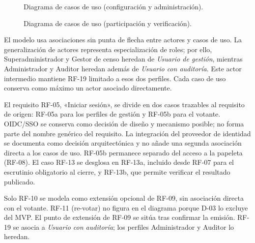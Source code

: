 \begin{figure}[p]
  \centering
  \resizebox{0.94\textwidth}{!}{}
  \caption{Diagrama de casos de uso (configuración y administración).}
  \label{fig:casos-uso-gestion}
\end{figure}

\begin{figure}[p]
  \centering
  \resizebox{0.94\textwidth}{!}{}
  \caption{Diagrama de casos de uso (participación y verificación).}
  \label{fig:casos-uso-votacion}
\end{figure}

El modelo usa asociaciones sin punta de flecha entre actores y casos de uso.
La generalización de actores representa especialización de roles; por ello,
Superadministrador y Gestor de censo heredan de \emph{Usuario de gestión},
mientras Administrador y Auditor heredan además de \emph{Usuario con auditoría}.
Este actor intermedio mantiene RF-19 limitado a esos dos perfiles. Cada caso de uso conserva como máximo un actor asociado directamente.

El requisito RF-05, «Iniciar sesión», se divide en dos casos trazables al requisito de origen: RF-05a para los perfiles de gestión y RF-05b para el votante. OIDC/SSO se conserva como decisión de diseño y mecanismo posible; no forma parte del nombre genérico del requisito. La integración del proveedor de identidad se documenta como decisión arquitectónica y no añade una segunda asociación directa a los casos de uso. RF-05b permanece separado del acceso a la papeleta (RF-08). El caso RF-13 se desglosa en RF-13a, incluido desde RF-07 para el
escrutinio obligatorio al cierre, y RF-13b, que permite verificar el resultado
publicado.

Solo RF-10 se modela como extensión opcional de RF-09, sin asociación directa
con el votante. RF-11 (re-votar) no figura en el diagrama porque D-03 lo
excluye del MVP. El punto de extensión de RF-09 se sitúa tras confirmar
la emisión. RF-19 se asocia a \emph{Usuario con auditoría}; los perfiles
Administrador y Auditor lo heredan.
\fi
